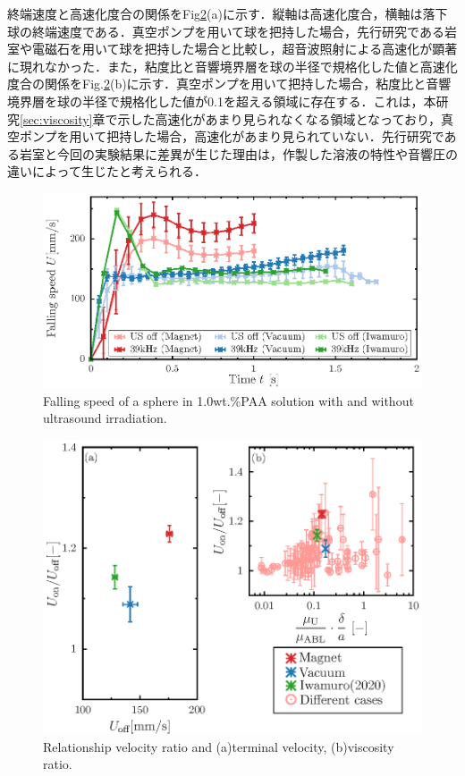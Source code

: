終端速度と高速化度合の関係をFig\ref{fig:falling-Udiff}(a)に示す．縦軸は高速化度合，横軸は落下球の終端速度である．真空ポンプを用いて球を把持した場合，先行研究である岩室\cite{ref:8}や電磁石を用いて球を把持した場合と比較し，超音波照射による高速化が顕著に現れなかった．また，粘度比と音響境界層を球の半径で規格化した値と高速化度合の関係をFig.\ref{fig:falling-Udiff}(b)に示す．真空ポンプを用いて把持した場合，粘度比と音響境界層を球の半径で規格化した値が0.1を超える領域に存在する．これは，本研究\ref{sec:viscosity}章で示した高速化があまり見られなくなる領域となっており，真空ポンプを用いて把持した場合，高速化があまり見られていない．先行研究である岩室\cite{ref:8}と今回の実験結果に差異が生じた理由は，作製した溶液の特性や音響圧の違いによって生じたと考えられる．
\begin{figure}[H]
    \centering
    \includegraphics[width=1\textwidth]{./X-Appendix/magnet_vacuum/magnet_vacuum.eps}
    \caption{Falling speed of a sphere in 1.0wt.\%PAA solution with and without ultrasound irradiation.}
    \label{fig:falling-A}
\end{figure}

\begin{figure}[H]
    \centering
    \includegraphics[width=1\textwidth]{./X-Appendix/magnet_vacuum/magnet_vacuum_cal.eps}
    \caption{Relationship velocity ratio and (a)terminal velocity, (b)viscosity ratio.}
    \label{fig:falling-Udiff}
\end{figure}

